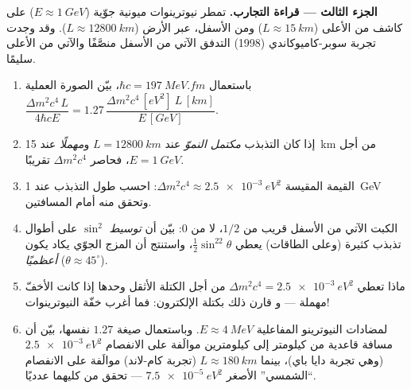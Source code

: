 \begin{problem}
\medskip\noindent\textbf{الجزء الثالث --- قراءة التجارب.}
تمطر نيوترينوات ميونية جوّية ($E \approx \qty{1}{GeV}$) على
كاشف من الأعلى ($L \approx \qty{15}{km}$) ومن الأسفل،
عبر الأرض ($L \approx \qty{12800}{km}$). وقد وجدت تجربة سوبر-كاميوكاندي
(1998) التدفق الآتي من الأسفل منصَّفًا والآتي من الأعلى سليمًا.
\begin{enumerate}[resume]
  \item باستعمال $\hbar c = \qty{197}{MeV.fm}$، بيّن الصورة
        العملية $\dfrac{\Delta m^2c^4\,L}{4\hbar cE} = 1.27\,
        \dfrac{\Delta m^2c^4\,[\unit{eV^2}]\ L\,[\unit{km}]}
        {E\,[\unit{GeV}]}$.
  \item إذا كان التذبذب \emph{مكتمل النموّ} عند $L =
        \qty{12800}{km}$ و\emph{مهملًا} عند \qty{15}{km} من أجل
        $E = \qty{1}{GeV}$، فحاصر $\Delta m^2c^4$ تقريبًا.
  \item القيمة المقيسة $\Delta m^2c^4 \approx
        \qty{2.5e-3}{eV^2}$: احسب طول التذبذب عند
        \qty{1}{GeV} وتحقق منه أمام المسافتين.
  \item الكبت الآتي من الأسفل قريب من $1/2$، لا من $0$:
        بيّن أن \emph{توسيط} $\sin^2$ على أطوال تذبذب كثيرة
        (وعلى الطاقات) يعطي $\tfrac12\sin^22\theta$،
        واستنتج أن المزج الجوّي يكاد يكون
        \emph{أعظميًا} ($\theta \approx 45^\circ$).
  \item ماذا تعطي $\Delta m^2c^4 = \qty{2.5e-3}{eV^2}$ من أجل
        الكتلة الأثقل وحدها إذا كانت الأخفّ مهملة --- و
        قارن ذلك بكتلة الإلكترون: فما أغرب خفّة
        النيوترينوات!
  \item لمضادات النيوترينو المفاعلية $E \approx \qty{4}{MeV}$. وباستعمال
        صيغة $1.27$ نفسها، بيّن أن مسافة قاعدية من كيلومتر إلى
        كيلومترين موالَفة على الانفصام $\qty{2.5e-3}{eV^2}$
        (وهي تجربة دايا باي)، بينما $L \approx \qty{180}{km}$
        (تجربة كام-لاند) موالَفة على الانفصام ``الشمسي'' الأصغر
        $\qty{7.5e-5}{eV^2}$ --- تحقق من كليهما عدديًا.
\end{enumerate}


\end{problem}

